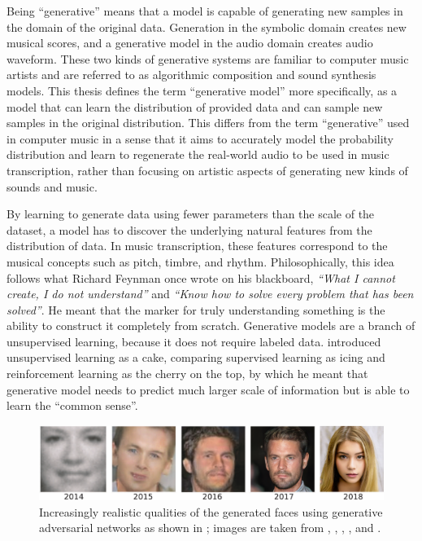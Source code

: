 Being ``generative'' means that a model is capable of generating new samples in the domain of the original data.
Generation in the symbolic domain creates new musical scores, and a generative model in the audio domain creates audio waveform.
These two kinds of generative systems are familiar to computer music artists and are referred to as algorithmic composition \cite{fernandez2013ai} and sound synthesis \cite{cook2002synthesis} models.
This thesis defines the term ``generative model'' more specifically, as a model that can learn the distribution of provided data and can sample new samples in the original distribution.
This differs from the term ``generative'' used in computer music in a sense that it aims to accurately model the probability distribution and learn to regenerate the real-world audio to be used in music transcription, rather than focusing on artistic aspects of generating new kinds of sounds and music.

By learning to generate data using fewer parameters than the scale of the dataset, a model has to discover the underlying natural features from the distribution of data.
In music transcription, these features correspond to the musical concepts such as pitch, timbre, and rhythm.
Philosophically, this idea follows what Richard Feynman once wrote on his blackboard, \emph{``What I cannot create, I do not understand''} and \emph{``Know how to solve every problem that has been solved''}.
He meant that the marker for truly understanding something is the ability to construct it completely from scratch.
Generative models are a branch of unsupervised learning, because it does not require labeled data.
 introduced unsupervised learning as a cake, comparing supervised learning as icing and reinforcement learning as the cherry on the top, by which he meant that generative model needs to predict much larger scale of information but is able to learn the ``common sense''.

\begin{figure}
	\includegraphics[width=\textwidth]{generative-evolution.pdf}
	\caption{Increasingly realistic qualities of the generated faces using generative adversarial networks as shown in \protect\cite{brundage2018malicious}; images are taken from \protect\cite{goodfellow2014gan}, \protect\cite{radford2015dcgan}, \protect\cite{liu2016cogan}, \protect\cite{karras2017pggan}, and \protect\cite{karras2019stylegan}.} 
	\label{fig:generative-evolution}
\end{figure}


